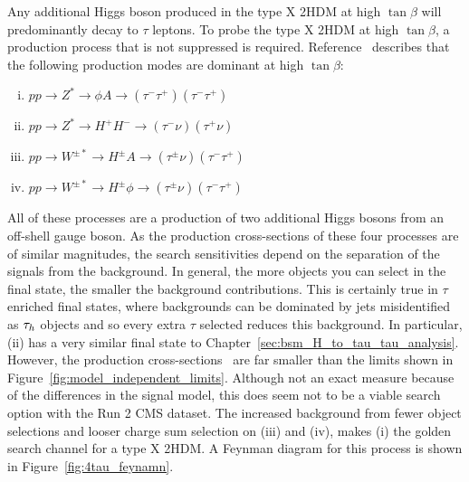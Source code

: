 Any additional Higgs boson produced in the type X \ac{2HDM} at high $\tan\beta$ will predominantly decay to $\tau$ leptons.
To probe the type X \ac{2HDM} at high $\tan\beta$, a production process that is not suppressed is required.
Reference~\cite{Jueid:2021avn} describes that the following production modes are dominant at high $\tan\beta$:
\begin{enumerate}[i)]
  \item $pp \rightarrow Z^{*} \rightarrow \phi A \rightarrow (\tau^{-}\tau^{+})(\tau^{-}\tau^{+})$
  \item $pp \rightarrow Z^{*} \rightarrow H^{+}H^{-} \rightarrow (\tau^{-}\nu)(\tau^{+}\nu)$
  \item $pp \rightarrow W^{\pm *} \rightarrow H^{\pm}A \rightarrow (\tau^{\pm}\nu)(\tau^{-}\tau^{+})$
  \item $pp \rightarrow W^{\pm *} \rightarrow H^{\pm}\phi \rightarrow (\tau^{\pm}\nu)(\tau^{-}\tau^{+})$
\end{enumerate}
All of these processes are a production of two additional Higgs bosons from an off-shell gauge boson.
As the production cross-sections of these four processes are of similar magnitudes, the search sensitivities depend on the separation of the signals from the background.
In general, the more objects you can select in the final state, the smaller the background contributions.
This is certainly true in $\tau$ enriched final states, where backgrounds can be dominated by jets misidentified as $\tau_{h}$ objects and so every extra $\tau$ selected reduces this background.
In particular, (ii) has a very similar final state to Chapter~\ref{sec:bsm_H_to_tau_tau_analysis}.
However, the production cross-sections~\cite{Jueid:2021avn} are far smaller than the limits shown in Figure~\ref{fig:model_independent_limits}.
Although not an exact measure because of the differences in the signal model, this does seem not to be a viable search option with the Run 2 \ac{CMS} dataset.
The increased background from fewer object selections and looser charge sum selection on (iii) and (iv), makes (i) the golden search channel for a type X \ac{2HDM}. 
A Feynman diagram for this process is shown in Figure~\ref{fig:4tau_feynamn}. \\

